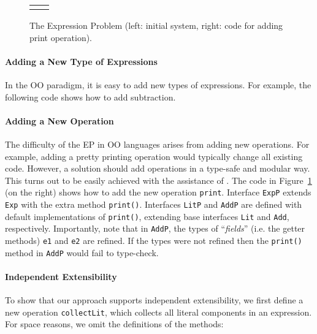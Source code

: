 \begin{figure}
\begin{tabular}{l|l}
&
\end{tabular}
\caption{The Expression Problem (left: initial system, right: code for adding
  print operation).}\label{fig:ep}
\end{figure}%

\paragraph{Adding a New Type of Expressions}
In the OO paradigm, it is easy to add new types of expressions. For example, the
following code shows how to add subtraction.


\paragraph{Adding a New Operation} The difficulty of the EP in OO  
languages arises from adding new operations. For example, adding a pretty printing 
operation would typically change all existing code. However, a solution 
should add operations in a type-safe and modular way. This
turns out to be easily achieved with the assistance of \mixin.  The code in
Figure~\ref{fig:ep} (on the right) shows how to add the new operation \texttt{print}.
Interface \texttt{ExpP} extends \texttt{Exp} with the extra method
\texttt{print()}. Interfaces \texttt{LitP} and \texttt{AddP} are defined with
default implementations of \texttt{print()}, extending base interfaces
\texttt{Lit} and \texttt{Add}, respectively. Importantly, note that in
\texttt{AddP}, the types of ``\emph{fields}'' (i.e. the getter methods)
\texttt{e1} and \texttt{e2} are refined. If the types were not refined then
the \texttt{print()} method in \texttt{AddP} would fail to type-check.

\paragraph{Independent Extensibility}
To show that our approach supports independent extensibility, we first define a
new operation \texttt{collectLit}, which collects all
literal components in an expression. For space reasons, 
we omit the definitions of the methods: 

